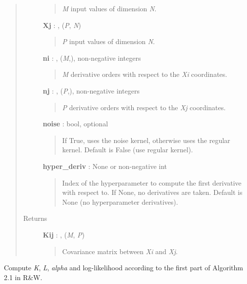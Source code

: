 \documentclass[letterpaper,10pt,english]{sphinxmanual}
\begin{document}
\begin{fulllineitems}
\begin{fulllineitems}
\begin{quote}
\begin{description}
\begin{quote}
\emph{M} input values of dimension \emph{N}.
\end{quote}

\textbf{Xj} : , (\emph{P}, \emph{N})
\begin{quote}

\emph{P} input values of dimension \emph{N}.
\end{quote}

\textbf{ni} : , (\emph{M},), non-negative integers
\begin{quote}

\emph{M} derivative orders with respect to the \emph{Xi} coordinates.
\end{quote}

\textbf{nj} : , (\emph{P},), non-negative integers
\begin{quote}

\emph{P} derivative orders with respect to the \emph{Xj} coordinates.
\end{quote}

\textbf{noise} : bool, optional
\begin{quote}

If True, uses the noise kernel, otherwise uses the regular kernel.
Default is False (use regular kernel).
\end{quote}

\textbf{hyper\_deriv} : None or non-negative int
\begin{quote}

Index of the hyperparameter to compute the first derivative with
respect to. If None, no derivatives are taken. Default is None (no
hyperparameter derivatives).
\end{quote}

\item[{Returns }] \leavevmode
\textbf{Kij} : , (\emph{M}, \emph{P})
\begin{quote}

Covariance matrix between \emph{Xi} and \emph{Xj}.
\end{quote}

\end{description}\end{quote}

\end{fulllineitems}


\begin{fulllineitems}
\label{gptools:gptools.gaussian_process.GaussianProcess.compute_K_L_alpha_ll}
Compute \emph{K}, \emph{L}, \emph{alpha} and log-likelihood according to the first part of Algorithm 2.1 in R\&W.


\end{fulllineitems}
\end{fulllineitems}
\end{document}
